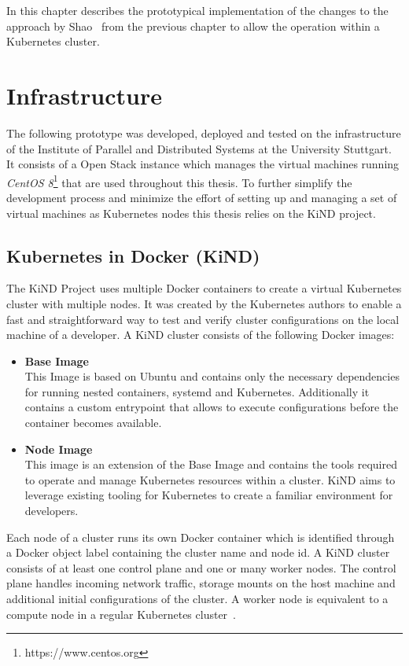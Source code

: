 \label{chap:prototype}
In this chapter describes the prototypical implementation of the changes to the approach by Shao~\cite{shao} from the previous chapter to allow the operation within a Kubernetes cluster.

\section{Infrastructure}
The following prototype was developed, deployed and tested on the infrastructure of the Institute of Parallel and Distributed Systems at the University Stuttgart.
It consists of a Open Stack instance which manages the virtual machines running \textit{CentOS 8}\footnote{https://www.centos.org} that are used throughout this thesis.
To further simplify the development process and minimize the effort of setting up and managing a set of virtual machines as Kubernetes nodes this thesis relies on the KiND project.

\subsection{Kubernetes in Docker (KiND)}
The KiND Project uses multiple Docker containers to create a virtual Kubernetes cluster with multiple nodes.
It was created by the Kubernetes authors to enable a fast and straightforward way to test and verify cluster configurations on the local machine of a developer.
A KiND cluster consists of the following Docker images:
\begin{itemize}
    \item[]{\textbf{Base Image}\\
    This Image is based on Ubuntu and contains only the necessary dependencies for running nested containers, systemd and Kubernetes.
    Additionally it contains a custom entrypoint that allows to execute configurations before the container becomes available.}
    \item[]{\textbf{Node Image}\\
    This image is an extension of the Base Image and contains the tools required to operate and manage Kubernetes resources within a cluster.
    KiND aims to leverage existing tooling for Kubernetes to create a familiar environment for developers.}
\end{itemize}
Each node of a cluster runs its own Docker container which is identified through a Docker object label containing the cluster name and node id.
A KiND cluster consists of at least one control plane and one or many worker nodes.
The control plane handles incoming network traffic, storage mounts on the host machine and additional initial configurations of the cluster.
A worker node is equivalent to a compute node in a regular Kubernetes cluster~\cite{kind, KUB3}.

